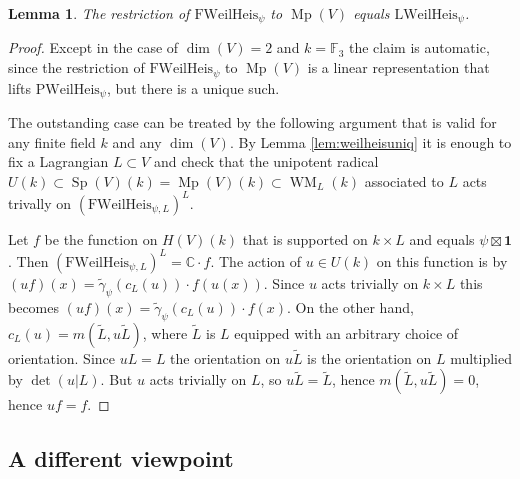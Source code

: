 \documentclass{article}
\def\C{\mathbb{C}}
\def\F{\mathbb{F}}
\DeclareMathOperator{\Sp}{Sp}
\newtheorem{lem}[thm]{Lemma}
\theoremstyle{definition}
\numberwithin{equation}{subsection}
\renewcommand{\-}{\hyp{}}
\DeclareMathOperator{\Mp}{Mp}
\DeclareMathOperator{\WM}{WM}
\begin{document}
\begin{appendices}
\begin{lem} \label{lem:fweilheisrest}
	The restriction of $\mathrm{FWeilHeis}_\psi$ to $\Mp(V)$ equals $\mathrm{LWeilHeis}_\psi$.
\end{lem}
\begin{proof}
	Except in the case of $\dim(V)=2$ and $k=\F_3$ the claim is automatic, since the restriction of $\mathrm{FWeilHeis}_\psi$ to $\Mp(V)$ is a linear representation that lifts $\mathrm{PWeilHeis}_\psi$, but there is a unique such.

	The outstanding case can be treated by the following argument that is valid for any finite field $k$ and any $\dim(V)$. By Lemma \ref{lem:weilheisuniq} it is enough to fix a Lagrangian $L \subset V$ and check that the unipotent radical $U(k) \subset \Sp(V)(k)=\Mp(V)(k) \subset \WM_L(k)$ associated to $L$ acts trivally on $(\mathrm{FWeilHeis}_{\psi,L})^L$.

	Let $f$ be the function on $H(V)(k)$ that is supported on $k \times L$ and equals $\psi \boxtimes \mathbf{1}$. Then $(\mathrm{FWeilHeis}_{\psi,L})^L=\C \cdot f$. The action of $u \in U(k)$ on this function is by $(uf)(x)=\tilde\gamma_\psi(c_L(u))\cdot f(u(x))$. Since $u$ acts trivially on $k \times L$ this becomes $(uf)(x)=\tilde\gamma_\psi(c_L(u))\cdot f(x)$. On the other hand, $c_L(u)=m(\tilde L,u\tilde L)$, where $\tilde L$ is $L$ equipped with an arbitrary choice of orientation. Since $uL=L$ the orientation on $u\tilde L$ is the orientation on $L$ multiplied by $\det(u|L)$. But $u$ acts trivially on $L$, so $u\tilde L=\tilde L$, hence $m(\tilde L,u\tilde L)=0$, hence $uf=f$.
\end{proof}

\subsection{A different viewpoint}  \label{sub:WittgroupC} 


\end{appendices}
\end{document}
